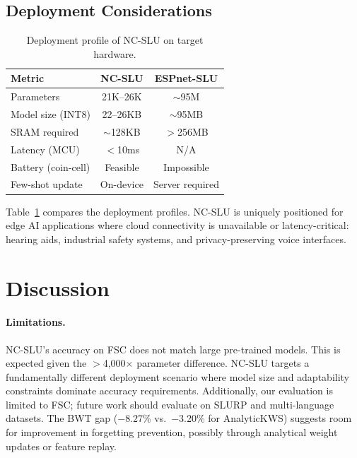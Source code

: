 \documentclass[11pt]{article}
\begin{document}
\subsection{Deployment Considerations}

\begin{table}[t]
\centering
\small
\caption{Deployment profile of NC-SLU on target hardware.}
\label{tab:deploy}
\begin{tabular}{@{}lcc@{}}
\toprule
\textbf{Metric} & \textbf{NC-SLU} & \textbf{ESPnet-SLU} \\
\midrule
Parameters       & 21K--26K    & $\sim$95M \\
Model size (INT8)& 22--26KB  & $\sim$95MB \\
SRAM required    & $\sim$128KB & $>$256MB \\
Latency (MCU)    & $<$10ms   & N/A \\
Battery (coin-cell) & Feasible & Impossible \\
Few-shot update  & On-device & Server required \\
\bottomrule
\end{tabular}
\end{table}

Table~\ref{tab:deploy} compares the deployment profiles.
NC-SLU is uniquely positioned for edge AI applications where cloud connectivity is unavailable or latency-critical: hearing aids, industrial safety systems, and privacy-preserving voice interfaces.

\section{Discussion}

\paragraph{Limitations.}
NC-SLU's accuracy on FSC does not match large pre-trained models.
This is expected given the $>$4,000$\times$ parameter difference.
NC-SLU targets a fundamentally different deployment scenario where model size and adaptability constraints dominate accuracy requirements.
Additionally, our evaluation is limited to FSC; future work should evaluate on SLURP \cite{bastianelli2020slurp} and multi-language datasets.
The BWT gap ($-$8.27\% vs.\ $-$3.20\% for AnalyticKWS) suggests room for improvement in forgetting prevention, possibly through analytical weight updates or feature replay.
\end{document}
